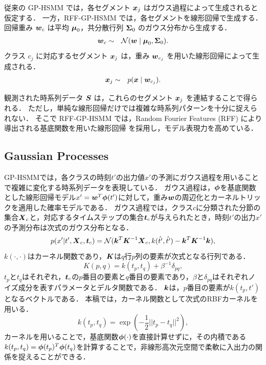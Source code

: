 \documentclass[conference]{IEEEtran}
\begin{document}
従来の GP-HSMM では，各セグメント ${ \boldsymbol x}_j$ はガウス過程によって生成されると仮定する．  
一方，RFF-GP-HSMM では，各セグメントを線形回帰で生成する．  
回帰重み ${ \boldsymbol w}_c$ は平均 ${\boldsymbol\mu}_0$，共分散行列 ${\boldsymbol\Sigma}_0$ のガウス分布から生成する．
%
\begin{eqnarray}
{ \boldsymbol w}_c &\sim& \mathcal{N}({ \boldsymbol w} \mid {\boldsymbol\mu}_0, {\boldsymbol\Sigma}_0).
\end{eqnarray}
%
クラス $c_j$ に対応するセグメント ${ \boldsymbol x}_j$ は，重み ${ \boldsymbol w}_{c_j}$ を用いた線形回帰によって生成される．
%
\begin{eqnarray}
{ \boldsymbol x}_j &\sim& p({ \boldsymbol x} \mid { \boldsymbol w}_{c_j}).
\end{eqnarray}

観測された時系列データ ${ \boldsymbol S}$ は，これらのセグメント ${ \boldsymbol x}_j$ を連結することで得られる．  
ただし，単純な線形回帰だけでは複雑な時系列パターンを十分に捉えられない．  
そこで RFF-GP-HSMM では，Random Fourier Features (RFF) により導出される基底関数を用いた線形回帰\cite{Rahimi2007} を採用し，モデル表現力を高めている．

\subsection{Gaussian Processes}
GP-HSMMでは，各クラスの時刻$t'$の出力値$x'$の予測にガウス過程を用いることで複雑に変化する時系列データを表現している．
ガウス過程は，${\boldsymbol\phi}$を基底関数とした線形回帰モデル$x' = { \boldsymbol w}^T {\boldsymbol\phi}(t')$に対して，重み${ \boldsymbol w}$の周辺化とカーネルトリックを適用した確率モデルである．
ガウス過程では，クラス$c$に分類された分節の集合${ \boldsymbol X}_c$と，対応するタイムステップの集合${ \boldsymbol t}_c$が与えられたとき，時刻$t'$の出力$x'$の予測分布は次式のガウス分布となる．
%
\begin{equation}
p(x'|t',\bX_c, \bt_c)  = {\mathcal N}(\bk^{T}\bK^{-1}\bX_c, k(\hat{t'}, \hat{t'})-\bk^{T}\bK^{-1}\bk), \label{eq:gp_pred}
\end{equation}
%
$k(\cdot, \cdot)$はカーネル関数であり，${ \boldsymbol K}$は$q$行$p$列の要素が次式となる行列である．
%
\begin{equation}
\label{equ:covariance_func}
K(p, q)=k(t_{p},t_{q})+\beta^{-1}\delta_{pq}, 
\end{equation}
%
$t_p$と$t_q$はそれぞれ，${ \boldsymbol t}_c$の$p$番目の要素と$q$番目の要素であり，$\beta$と$\delta_{pq}$はそれぞれノイズ成分を表すパラメータとデルタ関数である．
${ \boldsymbol k}$は，$p$番目の要素が$k(t_p, t')$となるベクトルである．
本稿では，カーネル関数として次式のRBFカーネルを用いる．
%
\begin{equation}
k(t_p,t_q)=\exp(-\frac{1}{2}||t_{p}-t_{q}||^{2}), \label{eq:rbf}
\end{equation}
%
カーネルを用いることで，基底関数${\boldsymbol\phi}(\cdot)$を直接計算せずに，その内積である$k(t_p,t_q)={\boldsymbol\phi}(t_p)^T {\boldsymbol\phi}(t_q)$を計算することで，非線形高次元空間で柔軟に入出力の関係を捉えることができる．
\end{document}
